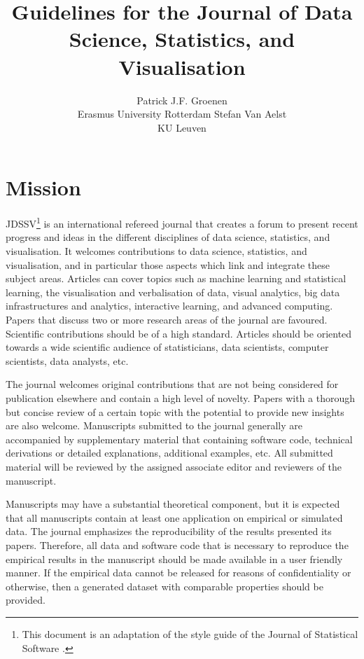 \documentclass[article]{jdssv}
\author{Patrick J.F. Groenen\\Erasmus University Rotterdam
   \And Stefan Van Aelst\\KU Leuven}
\title{Guidelines for the Journal of Data Science, Statistics, and Visualisation}
\begin{document}


\section{Mission}

JDSSV\footnote{This document is an adaptation of the style guide of the Journal of Statistical Software \citep{jss_style_guide}.} is an international refereed journal that creates a forum to present recent progress and ideas in the different disciplines of data science, statistics, and visualisation. It welcomes contributions to data science, statistics, and visualisation, and in particular those aspects which link and integrate these subject areas. Articles can cover topics such as machine learning and statistical learning, the visualisation and verbalisation of data, visual analytics, big data infrastructures and analytics, interactive learning, and advanced computing. Papers that discuss two or more research areas of the journal are favoured. Scientific contributions should be of a high standard. Articles should be oriented towards a wide scientific audience of statisticians, data scientists, computer scientists, data analysts, etc.

The journal welcomes original contributions that are not being considered for publication elsewhere and contain a high level of novelty. Papers with a thorough but concise review of a certain topic with the potential to provide new insights are also welcome. Manuscripts submitted to the journal generally are accompanied by supplementary material that containing software code, technical derivations or detailed explanations, additional examples, etc. All submitted material will be reviewed by the assigned associate editor and reviewers of the manuscript. 

Manuscripts may have a substantial theoretical component, but it is expected that all manuscripts contain at least one application on empirical or simulated data. The journal emphasizes the reproducibility of the results presented its papers. Therefore, all data and software code that is necessary to reproduce the empirical results in the manuscript should be made available in a user friendly manner. If the empirical data cannot be released for reasons of confidentiality or otherwise, then a generated dataset with comparable properties should be provided. 
\end{document}
